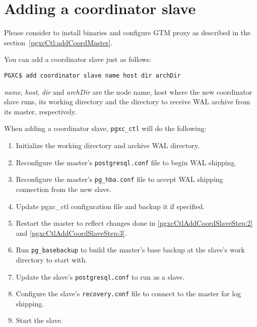 
\section{\label{pgxcCtl:addCoordSlave}Adding a coordinator slave}

  Please consider to install \XC{} binaries and configure GTM proxy as described in the
  section~\ref{pgxcCtl:addCoordMaster}.
  
  You can add a coordinator slave just as follows:
  
  \begin{lstlisting}[frame=single]
PGXC$ add coordinator slave name host dir archDir
  \end{lstlisting}
  
  {\it name}, {\it host}, {\it dir} and {\it archDir} are the node name, host where the new
  coordinator slave runs, its working directory and the directory to receive WAL archive from
  its master, respectively.
  
  When adding a coordinator slave, \verb|pgxc_ctl| will do the following:
  
  \begin{enumerate}
	  \item Initialize the working directory and archive WAL directory.
	  \item \label{pgxcCtlAddCoordSlaveStep:2}Reconfigure the master's \verb|postgresql.conf|
	  		file to begin WAL shipping.
	  \item \label{pgxcCtlAddCoordSlaveStep:3}Reconfigure the master's \verb|pg_hba.conf|
	  		file to accept WAL shipping connection from the new slave.
	  \item Update pgxc\_ctl configuration file and backup it if specified.
	  \item Restart the master to reflect changes done in \ref{pgxcCtlAddCoordSlaveStep:2} and
	  		\ref{pgxcCtlAddCoordSlaveStep:3}.
	  \item Run \verb|pg_basebackup| to build the master's base backup at the slave's work
	  		directory to start with.
	  \item Update the slave's \verb|postgresql.conf| to run as a slave.
	  \item Configure the slave's \verb|recovery.conf| file to connect to the master for log shipping.
	  \item Start the slave.
  \end{enumerate}



